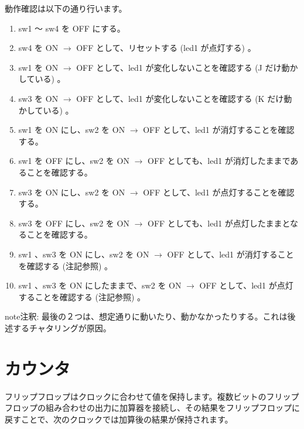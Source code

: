 \documentclass[letterpaper,10pt,dvipdfmx]{sphinxmanual}
\begin{document}
動作確認は以下の通り行います。
\begin{enumerate}
%
\item {} 
sw1 ～ sw4 を OFF にする。

\item {} 
sw4 を ON \(\rightarrow\) OFF として、リセットする (led1 が点灯する) 。

\item {} 
sw1 を ON \(\rightarrow\) OFF として、led1 が変化しないことを確認する (J だけ動かしている) 。

\item {} 
sw3 を ON \(\rightarrow\) OFF として、led1 が変化しないことを確認する (K だけ動かしている) 。

\item {} 
sw1 を ON にし、sw2 を ON \(\rightarrow\) OFF として、led1 が消灯することを確認する。

\item {} 
sw1 を OFF にし、sw2 を ON \(\rightarrow\) OFF としても、led1 が消灯したままであることを確認する。

\item {} 
sw3 を ON にし、sw2 を ON \(\rightarrow\) OFF として、led1 が点灯することを確認する。

\item {} 
sw3 を OFF にし、sw2 を ON \(\rightarrow\) OFF としても、led1 が点灯したままとなることを確認する。

\item {} 
sw1 、sw3 を ON にし、sw2 を ON \(\rightarrow\) OFF として、led1 が消灯することを確認する (注記参照) 。

\item {} 
sw1 、sw3 を ON にしたままで、sw2 を ON \(\rightarrow\) OFF として、led1 が点灯することを確認する (注記参照) 。

\end{enumerate}

\begin{sphinxadmonition}{note}{注釈:}
最後の２つは、想定通りに動いたり、動かなかったりする。これは後述するチャタリングが原因。
\end{sphinxadmonition}


\section{カウンタ}
\label{\detokenize{05_try:id15}}
フリップフロップはクロックに合わせて値を保持します。複数ビットのフリップフロップの組み合わせの出力に加算器を接続し、その結果をフリップフロップに戻すことで、次のクロックでは加算後の結果が保持されます。
\end{document}
